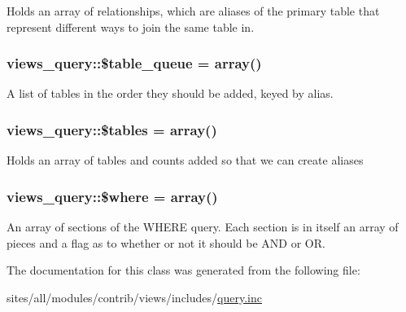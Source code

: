 Holds an array of relationships, which are aliases of the primary table that represent different ways to join the same table in. \hypertarget{classviews__query_209ff1ef3916cfbdfc70560e567a9cc0}{
\subsubsection[{\$table\_\-queue}]{\setlength{\rightskip}{0pt plus 5cm}views\_\-query::\$table\_\-queue = array()}}
\label{classviews__query_209ff1ef3916cfbdfc70560e567a9cc0}


A list of tables in the order they should be added, keyed by alias. \hypertarget{classviews__query_cec1482297b871cac1fddcef0a0e8ab1}{
\subsubsection[{\$tables}]{\setlength{\rightskip}{0pt plus 5cm}views\_\-query::\$tables = array()}}
\label{classviews__query_cec1482297b871cac1fddcef0a0e8ab1}


Holds an array of tables and counts added so that we can create aliases \hypertarget{classviews__query_2654e7db457f1b7ec34ca1ac3345fc83}{
\subsubsection[{\$where}]{\setlength{\rightskip}{0pt plus 5cm}views\_\-query::\$where = array()}}
\label{classviews__query_2654e7db457f1b7ec34ca1ac3345fc83}


An array of sections of the WHERE query. Each section is in itself an array of pieces and a flag as to whether or not it should be AND or OR. 

The documentation for this class was generated from the following file:\begin{CompactItemize}
\item 
sites/all/modules/contrib/views/includes/\hyperlink{query_8inc}{query.inc}\end{CompactItemize}
